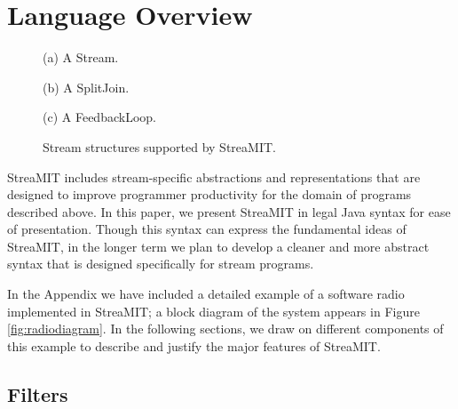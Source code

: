 \section{Language Overview}
\label{sec:overview}

\begin{figure}
\centering
{}

(a) A Stream. \\
\vspace{8pt}

(b) A SplitJoin. \\
\vspace{8pt}

(c) A FeedbackLoop. \\
\vspace{8pt}
\caption{Stream structures supported by StreaMIT.}
\label{fig:structuresp}
\end{figure}

StreaMIT includes stream-specific abstractions and representations
that are designed to improve programmer productivity for the domain of
programs described above.  In this paper, we present StreaMIT in legal
Java syntax for ease of presentation.  Though this syntax can express
the fundamental ideas of StreaMIT, in the longer term we plan to
develop a cleaner and more abstract syntax that is designed
specifically for stream programs.

\begin{figure*}
\centering
{}
\caption{A block diagram of a software radio.  A detailed
implementation in StreaMIT appears in the Appendix.}
\label{fig:radiodiagram}
\end{figure*}

In the Appendix we have included a detailed example of a software
radio implemented in StreaMIT; a block diagram of the system appears
in Figure \ref{fig:radiodiagram}.  In the following sections, we draw
on different components of this example to describe and justify the
major features of StreaMIT.

\subsection{Filters}



